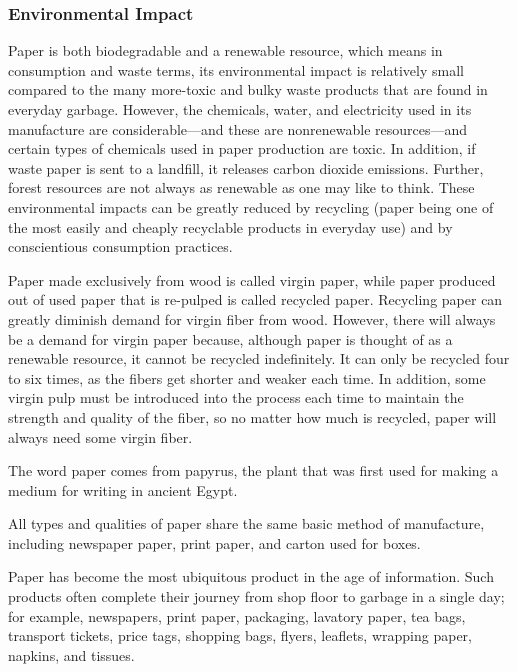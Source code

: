 
%
\subsubsection{Environmental Impact}
Paper is both biodegradable and a renewable resource, which means in consumption and waste terms, its environmental impact is relatively small compared to the many more-toxic and bulky waste products that are found in everyday garbage. However, the chemicals, water, and electricity used in its manufacture are considerable---and these are nonrenewable resources---and certain types of chemicals used in paper production are toxic. In addition, if waste paper is sent to a landfill, it releases carbon dioxide emissions. Further, forest resources are not always as renewable as one may like to think. These environmental impacts can be greatly reduced by recycling (paper being one of the most easily and cheaply recyclable products in everyday use) and by conscientious consumption practices.

Paper made exclusively from wood is called virgin paper, while paper produced out of used paper that is re-pulped is called recycled paper. Recycling paper can greatly diminish demand for virgin fiber from wood. However, there will always be a demand for virgin paper because, although paper is thought of as a renewable resource, it cannot be recycled indefinitely. It can only be recycled four to six times, as the fibers get shorter and weaker each time. In addition, some virgin pulp must be introduced into the process each time to maintain the strength and quality of the fiber, so no matter how much is recycled, paper will always need some virgin fiber.

The word paper comes from papyrus, the plant that was first used for making a medium for writing in ancient Egypt.

All types and qualities of paper share the same basic method of manufacture, including newspaper paper, print paper, and carton used for boxes.

Paper has become the most ubiquitous product in the age of information. Such products often complete their journey from shop floor to garbage in a single day; for example, newspapers, print paper, packaging, lavatory paper, tea bags, transport tickets, price tags, shopping bags, flyers, leaflets, wrapping paper, napkins, and tissues. 

